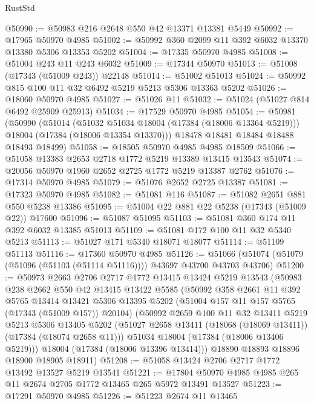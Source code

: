 \begin{lexlean}{RustStd}
\begin{coremodule}
@50990 := @50983 @216 @2648 @550 @42 @13371 @13381 @5449
@50992 := @17965 @50970 @4985
@51002 := @50992 @360 @2099 @11 @392 @6032 @13370 @13380 @5306 @13353 @5202
@51004 := @17335 @50970 @4985
@51008 := @51004 @243 @11 @243 @6032
@51009 := @17344 @50970
@51013 := @51008 (@17343 (@51009 @243)) @22148
@51014 := @51002 @51013
@51024 := @50992 @815 @100 @11 @32 @6492 @5219 @5213 @5306 @13363 @5202
@51026 := @18060 @50970 @4985
@51027 := @51026 @11
@51032 := @51024 (@51027 @814 @6492 @25909 @25913)
@51034 := @17529 @50970 @4985
@51054 := @50981
    (@50990
      (@51014
        (@51032 @51034 @18004 (@17384 (@18006 @13364 @5219)))
        @18004
        (@17384 (@18006 @13354 @13370)))
      @18478
      @18481
      @18484
      @18488
      @18493
      @18499)
@51058 := @18505 @50970 @4985 @4985 @18509
@51066 := @51058 @13383 @2653 @2718 @1772 @5219 @13389 @13415 @13543
@51074 := @20056 @50970 @1960 @2652 @2725 @1772 @5219 @13387 @2762
@51076 := @17314 @50970 @4985
@51079 := @51076 @2652 @2725 @13387
@51081 := @17323 @50970 @4985
@51082 := @51081 @116
@51087 := @51082 @2651 @881 @550 @5238 @13386
@51095 := @51004 @22 @881 @22 @5238 (@17343 (@51009 @22)) @17600
@51096 := @51087 @51095
@51103 := @51081 @360 @174 @11 @392 @6032 @13385 @51013
@51109 := @51081 @172 @100 @11 @32 @5340 @5213
@51113 := @51027 @171 @5340 @18071 @18077
@51114 := @51109 @51113
@51116 := @17360 @50970 @4985
@51126 := @51066 (@51074 (@51079 (@51096 (@51103 (@51114 @51116)))) @43697 @43700 @43703 @43706)
@51200 := @50973
    @2663
    @2706
    @2717
    @1772
    @13415
    @13424
    @5219
    @13543
    (@50983
      @238
      @2662
      @550
      @42
      @13415
      @13422
      @5585
      (@50992
        @358
        @2661
        @11
        @392
        @5765
        @13414
        @13421
        @5306
        @13395
        @5202
        (@51004 @157 @11 @157 @5765 (@17343 (@51009 @157)) @20104)
        (@50992
          @2659
          @100
          @11
          @32
          @13411
          @5219
          @5213
          @5306
          @13405
          @5202
          (@51027 @2658 @13411 (@18068 (@18069 @13411)) (@17384 (@18074 @2658 @11)))
          @51034
          @18004
          (@17384 (@18006 @13406 @5219)))
        @18004
        (@17384 (@18006 @13396 @13414)))
      @18890
      @18893
      @18896
      @18900
      @18905
      @18911)
@51208 := @51058 @13424 @2706 @2717 @1772 @13492 @13527 @5219 @13541
@51221 := @17804 @50970 @4985 @4985 @265 @11 @2674 @2705 @1772 @13465 @265 @5972 @13491 @13527
@51223 := @17291 @50970 @4985
@51226 := @51223 @2674 @11 @13465

\end{coremodule}
\end{lexlean}

